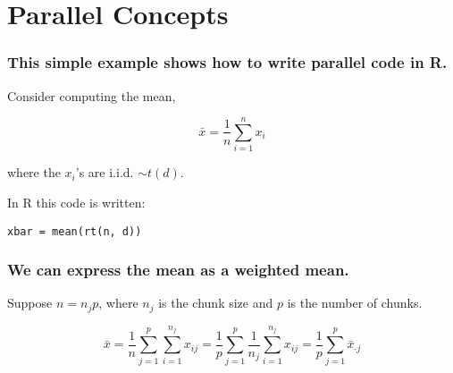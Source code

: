 \documentclass{beamer}
\begin{document}
\section{Parallel Concepts}
\begin{frame}[fragile]

\frametitle{This simple example shows how to write parallel code in R.}


Consider computing the mean,

\begin{equation}
    \bar{x} = \frac{1}{n} \sum_{i = 1}^n x_i
\label{eq:mean}
\end{equation}

where the $x_i$'s are i.i.d. $\sim t(d)$. 
    
In R this code is written:

\begin{verbatim}
xbar = mean(rt(n, d))
\end{verbatim}

\end{frame}
\begin{frame}

    \frametitle{We can express the mean as a weighted mean.}


Suppose $n = n_j p$, where $n_j$ is the chunk size and $p$ is the number of
chunks.

\begin{equation}
    \bar{x} = \frac{1}{n} \sum_{j = 1}^p \sum_{i = 1}^{n_j} x_{ij}
    = \frac{1}{p} \sum_{j = 1}^p \frac{1}{n_j} \sum_{i = 1}^{n_j} x_{ij}
    = \frac{1}{p} \sum_{j = 1}^p \bar{x}_{\cdot j}
\label{eq:mean_partial}
\end{equation}

\end{frame}
\end{document}
